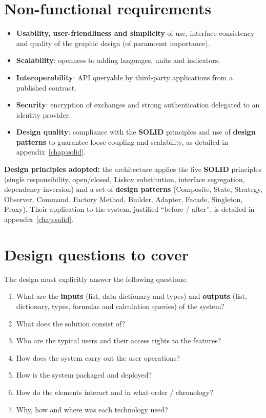 \section{Non-functional requirements}
\begin{itemize}
  \item \textbf{Usability, user-friendliness and simplicity} of use, interface consistency and quality of the graphic design (of paramount importance).
  \item \textbf{Scalability}: openness to adding languages, units and indicators.
  \item \textbf{Interoperability}: API queryable by third-party applications from a published contract.
  \item \textbf{Security}: encryption of exchanges and strong authentication delegated to an identity provider.
  \item \textbf{Design quality}: compliance with the \textbf{SOLID} principles and use of \textbf{design patterns} to guarantee loose coupling and scalability, as detailed in appendix~\ref{chap:solid}.
\end{itemize}

\begin{encadre}
\textbf{Design principles adopted:} the architecture applies the five
\textbf{SOLID} principles (single responsibility, open/closed, Liskov
substitution, interface segregation, dependency inversion) and a set of
\textbf{design patterns} (Composite, State, Strategy, Observer, Command, Factory
Method, Builder, Adapter, Facade, Singleton, Proxy). Their application to the
system, justified ``before / after'', is detailed in
appendix~\ref{chap:solid}.
\end{encadre}

\section{Design questions to cover}
The design must explicitly answer the following questions:
\begin{enumerate}
  \item What are the \textbf{inputs} (list, data dictionary and types) and \textbf{outputs} (list, dictionary, types, formulas and calculation queries) of the system?
  \item What does the solution consist of?
  \item Who are the typical users and their access rights to the features?
  \item How does the system carry out the user operations?
  \item How is the system packaged and deployed?
  \item How do the elements interact and in what order / chronology?
  \item Why, how and where was each technology used?
\end{enumerate}

